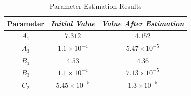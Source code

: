 \documentclass{CCI2020}
\begin{document}
\begin{table}[!h]
	\renewcommand{\arraystretch}{1.3}
	\caption{Parameter Estimation Results}
	\begin{center}
		\begin{tabular}{c c c}
			\hline
			\textbf{Parameter} & \textbf{\textit{Initial Value}}& \textbf{\textit{Value After Estimation}} \\
			\hline
			$A_1$ & $7.312$ & $4.152$ \\
			$A_3$  & $1.1\times10^{-4}$ & $5.47\times10^{-5}$\\
			$B_1$  & $4.53$ & $4.36$ \\
			$B_3$  & $1.1\times10^{-4}$ & $7.13\times10^{-5}$ \\ 
			$C_2$  & $5.45\times10^{-5}$ & $1.3\times10^{-5}$ \\
			\hline
		\end{tabular}
		\label{tab1}
	\end{center}
\end{table}
\end{document}
